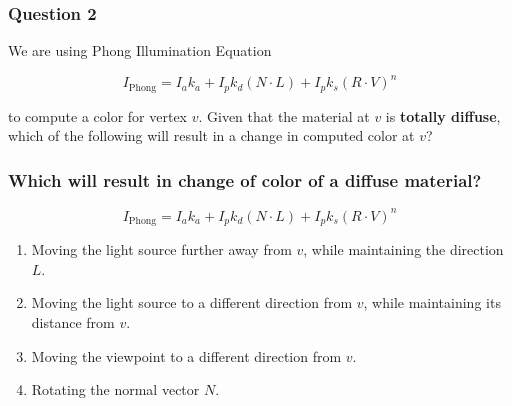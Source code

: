 \documentclass{beamer}
\begin{document}
\begin{frame}
    \frametitle{Question 2}


    We are using Phong Illumination Equation 

    \begin{equation*}
        I_\text{Phong} = I_a k_a + I_p k_d  (N \cdot L) + I_p k_s (R \cdot V)^n
    \end{equation*}

    to compute a color for vertex $v$. Given that the material at $v$ is 
    \textbf{totally diffuse}, which of the following will result in a change in computed color at $v$?

\end{frame}


\begin{frame}
    \frametitle{Which will result in change of color of a diffuse material?}

    \begin{equation*}
        I_\text{Phong} = I_a k_a + I_p k_d  (N \cdot L) + I_p k_s (R \cdot V)^n
    \end{equation*}

    \begin{enumerate}
        \item Moving the light source further away from $v$, while maintaining the direction $L$.
        \item Moving the light source to a different direction from $v$, while maintaining its distance from $v$.
        \item Moving the viewpoint to a different direction from $v$.
        \item Rotating the normal vector $N$.
    \end{enumerate}

\end{frame}
\end{document}
